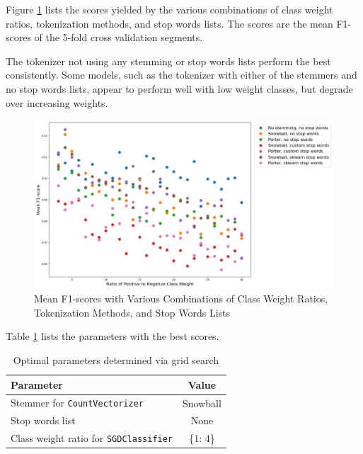 \documentclass[11pt]{article}
\begin{document}
Figure \ref{fig:cv} lists the scores yielded by the various combinations of class weight ratios, tokenization methods, and stop words lists. The scores are the mean F1-scores of the 5-fold cross validation segments.

The tokenizer not using any stemming or stop words lists perform the best consistently. Some models, such as the tokenizer with either of the stemmers and no stop words lists, appear to perform well with low weight classes, but degrade over increasing weights.

\begin{figure}[!ht]
    \includegraphics[scale=0.46]{statics/cv.png}
    \centering
    \caption{Mean F1-scores with Various Combinations of Class Weight Ratios, Tokenization Methods, and Stop Words Lists}
    \label{fig:cv}
\end{figure}

Table \ref{table:gs1_param} lists the parameters with the best scores.
\begin{table}[!ht]
    \caption{Optimal parameters determined via grid search}
    \label{table:gs1_param}
    \begin{center}

        \begin{tabular}{| l | c |}
        \hline
        \textbf{Parameter} & \textbf{Value}
        \\ \hline
        Stemmer for \texttt{CountVectorizer} & Snowball
        \\ \hline
        Stop words list & None
        \\ \hline
        Class weight ratio for \texttt{SGDClassifier} & \{1: 4\}
        \\ \hline
        \end{tabular}

    \end{center}

\end{table}
\end{document}
